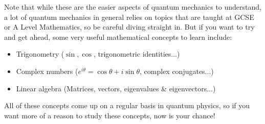 \documentclass[twocolumn]{article}
\begin{document}
Note that while these are the easier aspects of quantum mechanics to understand, a lot of quantum mechanics in general relies on topics that are taught at GCSE or A Level Mathematics, so be careful diving straight in. But if you want to try and get ahead, some very useful mathematical concepts to learn include:

\begin{itemize}
\item Trigonometry ($\sin, \cos$, trigonometric identities...)
\item Complex numbers ($e^{i\theta} = \cos\theta + i\sin\theta$, complex conjugates...)
\item Linear algebra (Matrices, vectors, eigenvalues \& eigenvectors...)
\end{itemize}

All of these concepts come up on a regular basis in quantum physics, so if you want more of a reason to study these concepts, now is your chance!
\end{document}
